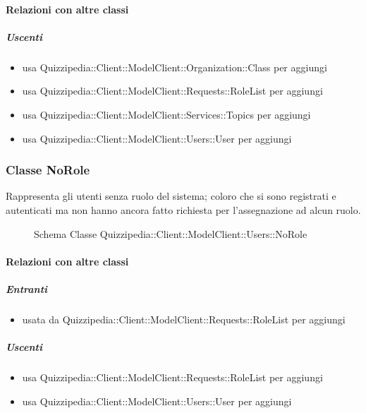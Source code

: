 \paragraph{Relazioni con altre classi}
\subparagraph{Uscenti}
\begin{itemize}
\item usa Quizzipedia::Client::ModelClient::Organization::Class per aggiungi
\item usa Quizzipedia::Client::ModelClient::Requests::RoleList per aggiungi
\item usa Quizzipedia::Client::ModelClient::Services::Topics per aggiungi
\item usa Quizzipedia::Client::ModelClient::Users::User per aggiungi
\end{itemize}
\subsubsection{Classe NoRole}
Rappresenta gli utenti senza ruolo del sistema; coloro che si sono registrati e autenticati ma non hanno ancora fatto richiesta per l'assegnazione ad alcun ruolo.
\begin{figure}[H]
\centering
\noindent{}
\caption[Schema Classe NoRole]{Schema Classe Quizzipedia::Client::ModelClient::Users::NoRole}
\end{figure}
\paragraph{Relazioni con altre classi}
\subparagraph{Entranti}
\begin{itemize}
\item usata da Quizzipedia::Client::ModelClient::Requests::RoleList per aggiungi
\end{itemize}
\subparagraph{Uscenti}
\begin{itemize}
\item usa Quizzipedia::Client::ModelClient::Requests::RoleList per aggiungi
\item usa Quizzipedia::Client::ModelClient::Users::User per aggiungi
\end{itemize}
